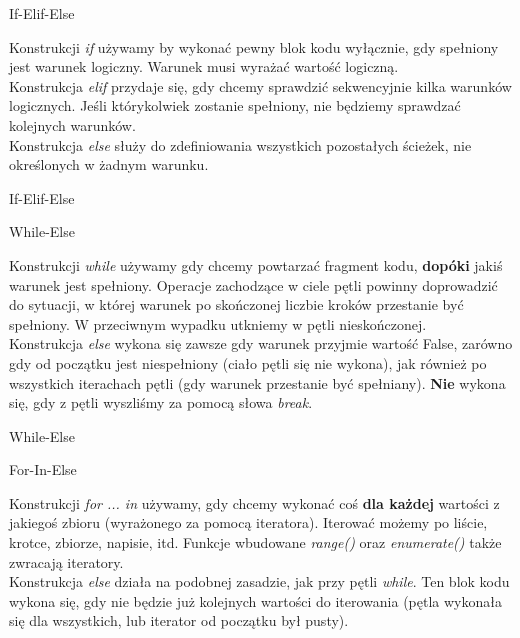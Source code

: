 \begin{frame}{If-Elif-Else}
    
    Konstrukcji \emph{if} używamy by wykonać pewny blok kodu wyłącznie, gdy spełniony jest warunek logiczny. Warunek musi wyrażać wartość logiczną. \\
    Konstrukcja \emph{elif} przydaje się, gdy chcemy sprawdzić sekwencyjnie kilka warunków logicznych. Jeśli którykolwiek zostanie spełniony, nie będziemy sprawdzać kolejnych warunków. \\
    Konstrukcja \emph{else} służy do zdefiniowania wszystkich pozostałych ścieżek, nie określonych w żadnym warunku.
\end{frame}

\begin{frame}{If-Elif-Else}
    
\end{frame}

\begin{frame}{While-Else}
    
    Konstrukcji \emph{while} używamy gdy chcemy powtarzać fragment kodu, \textbf{dopóki} jakiś warunek jest spełniony. Operacje zachodzące w ciele pętli powinny doprowadzić do sytuacji, w której warunek po skończonej liczbie kroków przestanie być spełniony. W przeciwnym wypadku utkniemy w pętli nieskończonej. \\
    Konstrukcja \emph{else} wykona się zawsze gdy warunek przyjmie wartość False, zarówno gdy od początku jest niespełniony (ciało pętli się nie wykona), jak również po wszystkich iterachach pętli (gdy warunek przestanie być spełniany). \textbf{Nie} wykona się, gdy z pętli wyszliśmy za pomocą słowa \emph{break}.
\end{frame}

\begin{frame}{While-Else}
    
\end{frame}

\begin{frame}{For-In-Else}
    
    Konstrukcji \emph{for ... in} używamy, gdy chcemy wykonać coś \textbf{dla każdej} wartości z jakiegoś zbioru (wyrażonego za pomocą iteratora). Iterować możemy po liście, krotce, zbiorze, napisie, itd. Funkcje wbudowane \emph{range()} oraz \emph{enumerate()} także zwracają iteratory. \\
    Konstrukcja \emph{else} działa na podobnej zasadzie, jak przy pętli \emph{while}. Ten blok kodu wykona się, gdy nie będzie już kolejnych wartości do iterowania (pętla wykonała się dla wszystkich, lub iterator od początku był pusty).
\end{frame}

